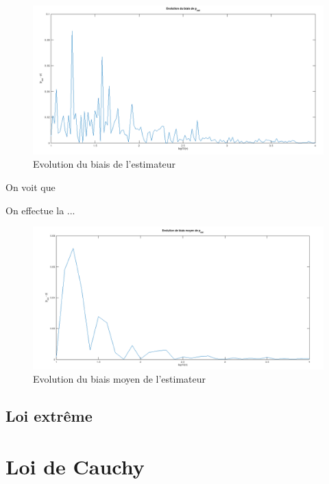 \documentclass[12pt,a4paper,titlepage]{article}
\begin{document}
\begin{figure}[!h]
\begin{center}
 \includegraphics[scale=0.3]{images/biaisGeom.png} 
\end{center}
 \caption{Evolution du biais de l'estimateur}
 \label{Evolution du biais de l'estimateur geom}
\end{figure}

On voit que

On effectue la ...





\begin{figure}[!h]
\begin{center}
 \includegraphics[scale=0.3]{images/biaisMoyGeom.png} 
\end{center}
 \caption{Evolution du biais moyen de l'estimateur}
 \label{Evolution du biais moyen de l'estimateur geom}
\end{figure}

\subsection{Loi extrême}



\section{Loi de Cauchy}
\end{document}
